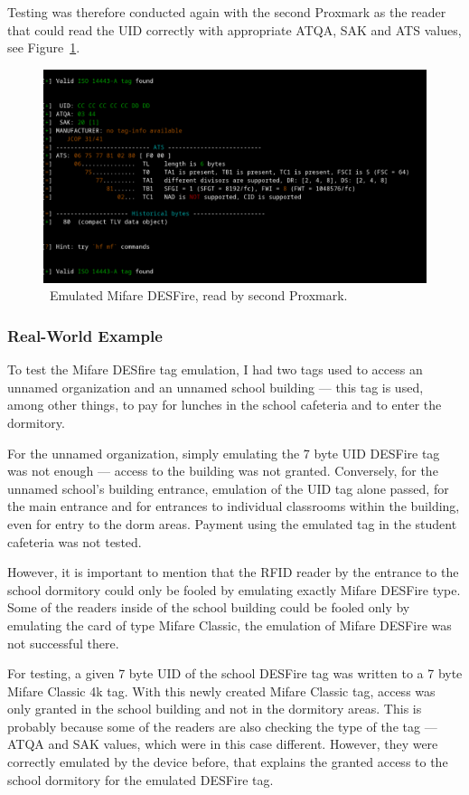 Testing was therefore conducted again with the second Proxmark as the reader that could read the UID correctly with appropriate ATQA, SAK and ATS values, see Figure~\ref{fig:desfireemulation}.

\begin{figure}[ht]
  \centering
  \includegraphics[width=13cm]{text/testing/des_emulation.png}
  \caption{~Emulated Mifare DESFire, read by second Proxmark.}
  \label{fig:desfireemulation}
\end{figure}

\subsubsection{Real-World Example}
To test the Mifare DESfire tag emulation, I had two tags used to access an unnamed organization and an unnamed school building --- this tag is used, among other things, to pay for lunches in the school cafeteria and to enter the dormitory. 

For the unnamed organization, simply emulating the 7 byte UID DESFire tag was not enough --- access to the building was not granted. Conversely, for the unnamed school's building entrance, emulation of the UID tag alone passed, for the main entrance and for entrances to individual classrooms within the building, even for entry to the dorm areas. Payment using the emulated tag in the student cafeteria was not tested. 

However, it is important to mention that the RFID reader by the entrance to the school dormitory could only be fooled by emulating exactly Mifare DESFire type. Some of the readers inside of the school building could be fooled only by emulating the card of type Mifare Classic, the emulation of Mifare DESFire was not successful there. 

For testing, a given 7 byte UID of the school DESFire tag was written to a 7 byte Mifare Classic 4k tag. With this newly created Mifare Classic tag, access was only granted in the school building and not in the dormitory areas. This is probably because some of the readers are also checking the type of the tag --- ATQA and SAK values, which were in this case different. However, they were correctly emulated by the device before, that explains the granted access to the school dormitory for the emulated DESFire tag.

